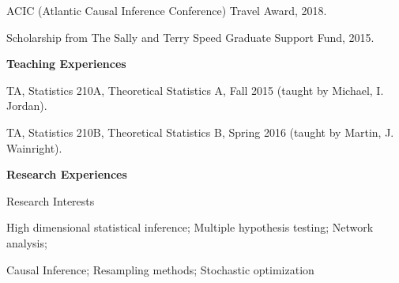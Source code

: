 \documentclass{article}
\begin{document}
\vspace{2mm}
ACIC (Atlantic Causal Inference Conference) Travel Award, 2018.

\vspace{2mm}
Scholarship from The Sally and Terry Speed Graduate Support Fund, 2015.

\vspace{5mm}
\begin{large}
\noindent \textbf{Teaching Experiences}
\end{large}
\vspace{5mm}

TA, Statistics 210A, Theoretical Statistics A, Fall 2015 (taught by Michael, I. Jordan). 



\vspace{2mm}
TA, Statistics 210B, Theoretical Statistics B, Spring 2016 (taught by Martin, J. Wainright). 




\vspace{5mm}
\begin{large}
\noindent \textbf{Research Experiences}
\end{large}
\vspace{5mm}

\begin{large}
\noindent Research Interests
\end{large}

\vspace{3mm}
High dimensional statistical inference; Multiple hypothesis testing; Network analysis; 

Causal Inference; Resampling methods; Stochastic optimization

\vspace{3mm}
\end{document}
